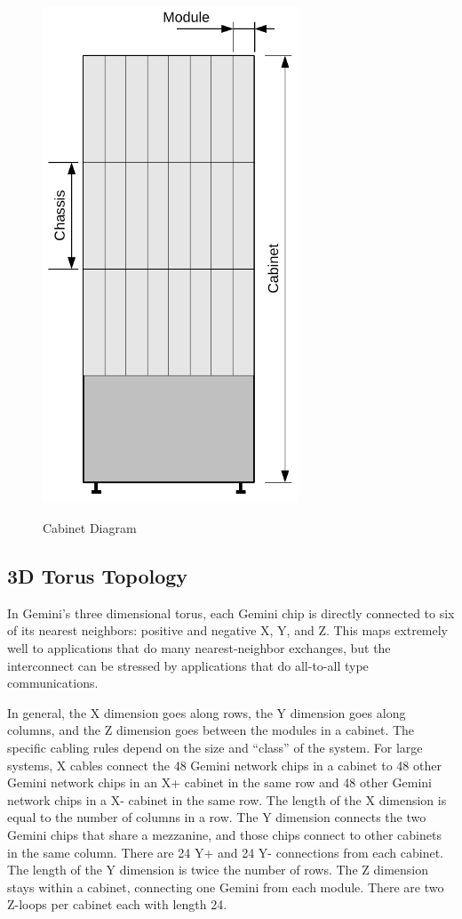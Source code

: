 \documentclass[10pt, conference, compsocconf]{IEEEtran}
\begin{document}
\begin{figure}
  \centering
  \includegraphics[width=3.0in]{figures/cabinet_diagram.pdf}\\
  \caption{Cabinet Diagram}\label{fig:cab}
\end{figure}

\subsection{3D Torus Topology}

In Gemini's three dimensional torus, each Gemini chip is directly connected to
six of its nearest neighbors: positive and negative X, Y, and Z.  This maps
extremely well to applications that do many nearest-neighbor exchanges, but the
interconnect can be stressed by applications that do all-to-all type
communications.

In general, the X dimension goes along rows, the Y dimension goes along
columns, and the Z dimension goes between the modules in a cabinet.  The
specific cabling rules depend on the size and ``class'' of the system.  For
large systems, X cables connect the 48 Gemini network chips in a cabinet to 48
other Gemini network chips in an X+ cabinet in the same row and 48 other Gemini
network chips in a X- cabinet in the same row.  The length of the X dimension
is equal to the number of columns in a row.  The Y dimension connects the two
Gemini chips that share a mezzanine, and those chips connect to other cabinets
in the same column.  There are 24 Y+ and 24 Y- connections from each cabinet.
The length of the Y dimension is twice the number of rows.  The Z dimension
stays within a cabinet, connecting one Gemini from each module.  There are two
Z-loops per cabinet each with length 24.
\end{document}

